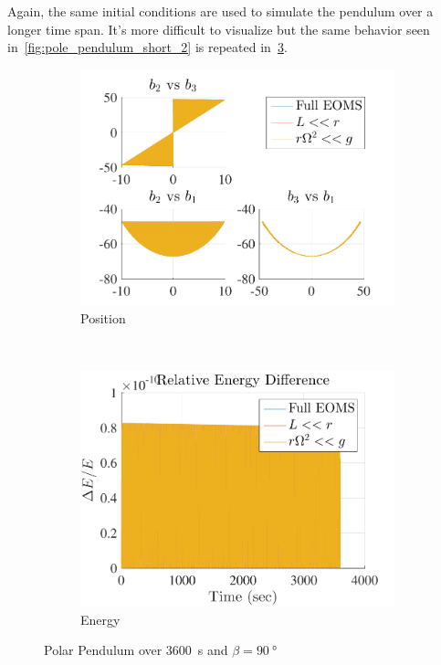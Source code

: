 \documentclass[11pt, reqno]{article}   	%
\begin{document}
Again, the same initial conditions are used to simulate the pendulum over a longer time span.
It's more difficult to visualize but the same behavior seen in~\cref{fig:pole_pendulum_short_2} is repeated in~\cref{fig:pole_pendulum_2}.
\begin{figure}[htbp] 
    \centering 
    \begin{subfigure}[htbp]{0.5\textwidth} 
        \includegraphics[width=\textwidth]{figures/pole_position_2.pdf} 
        \caption{Position } \label{fig:pole_pos_2} 
    \end{subfigure}~ %
    \begin{subfigure}[htbp]{0.5\textwidth} 
        \includegraphics[width=\textwidth]{figures/pole_energy_2.pdf} 
        \caption{Energy } \label{fig:pole_energy_2}
    \end{subfigure}
    \caption{Polar Pendulum over \SI{3600}{s} and \( \beta = \SI{90}{\degree} \)}
    \label{fig:pole_pendulum_2} 
\end{figure}
\end{document}
